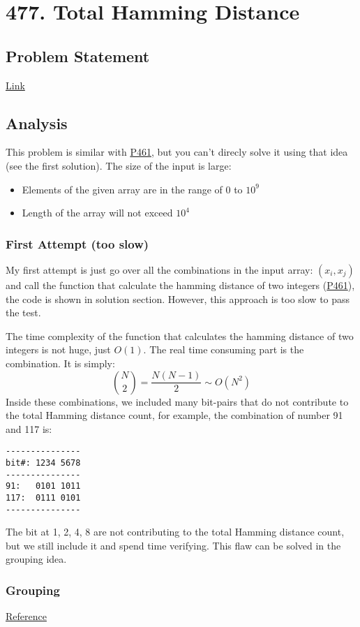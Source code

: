 \documentclass[12pt]{book}
\begin{document}
\chapter{477. Total Hamming Distance}
\label{sec:orgc8ecf57}
\section{Problem Statement}
\label{sec:orgbc5a0ed}
\href{https://leetcode.com/problems/total-hamming-distance/}{Link}
\section{Analysis}
\label{sec:org73dcb38}
This problem is similar with \hyperref[orgf8b6eb9]{P461}, but you can't direcly solve it using that idea (see the first solution). The size of the input is large:
\begin{itemize}
\item Elements of the given array are in the range of \(0\) to \(10^9\)
\item Length of the array will not exceed \(10^4\)
\end{itemize}

\subsection{First Attempt (too slow)}
\label{sec:org0bea46c}
My first attempt is just go over all the combinations in the input array: \((x_i, x_j)\) and call the function that calculate the hamming distance of two integers (\hyperref[orgf8b6eb9]{P461}), the code is shown in solution section. However, this approach is too slow to pass the test.

The time complexity of the function that calculates the hamming distance of two integers is not huge, just \(O(1)\). The real time consuming part is the combination. It is simply:
\[
{N \choose 2} = \frac{N(N-1)}{2} \sim O(N^2)
\]
Inside these combinations, we included many bit-pairs that do not contribute to the total Hamming distance count, for example, the combination of number 91 and 117 is:
\begin{verbatim}
---------------
bit#: 1234 5678
---------------
91:   0101 1011
117:  0111 0101
---------------
\end{verbatim}
The bit at 1, 2, 4, 8 are not contributing to the total Hamming distance count, but we still include it and spend time verifying. This flaw can be solved in the grouping idea.

\subsection{Grouping}
\label{sec:orga024ccf}
\href{https://leetcode.com/problems/total-hamming-distance/discuss/96250/C++-O(n)-runtime-O(1)-space}{Reference}
\end{document}
